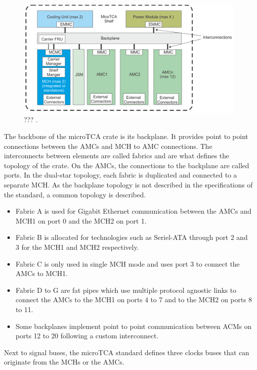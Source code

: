       \begin{figure}[h!]
        \centering
        \includegraphics[width=\textwidth]{img/II-2-daq/utca-crate.png}
        \caption{??? \cite{VADATECH}.}
        \label{fig:II-2-utca-crate}
      \end{figure}

      The backbone of the microTCA crate is its backplane. It provides point to point connections between the AMCs and MCH to AMC connections. The interconnects between elements are called fabrics and are what defines the topology of the crate. On the AMCs, the connections to the backplane are called ports. In the dual-star topology, each fabric is duplicated and connected to a separate MCH. As the backplane topology is not described in the specifications of the standard, a common topology is described.
      \begin{itemize}
        \item Fabric A is used for Gigabit Ethernet communication between the AMCs and MCH1 on port 0 and the MCH2 on port 1.
        \item Fabric B is allocated for technologies such as Seriel-ATA through port 2 and 3 for the MCH1 and MCH2 respectively.
        \item Fabric C is only used in single MCH mode and uses port 3 to connect the AMCs to MCH1.
        \item Fabric D to G are fat pipes which use multiple protocol agnostic links to connect the AMCs to the MCH1 on ports 4 to 7 and to the MCH2 on ports 8 to 11.
        \item Some backplanes implement point to point communication between ACMs on ports 12 to 20 following a custom interconnect.
      \end{itemize}
      Next to signal buses, the microTCA standard defines three clocks buses that can originate from the MCHs or the AMCs.

